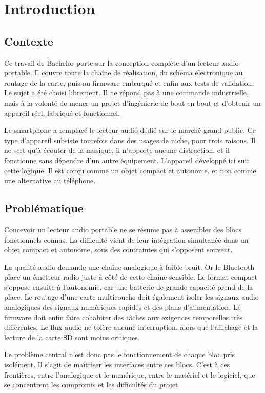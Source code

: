 \chapter{Introduction}

\section{Contexte}
Ce travail de Bachelor porte sur la conception complète d'un lecteur audio portable. Il couvre toute la chaîne de réalisation, du schéma électronique au routage de la carte, puis au firmware embarqué et enfin aux tests de validation. Le sujet a été choisi librement. Il ne répond pas à une commande industrielle, mais à la volonté de mener un projet d'ingénierie de bout en bout et d'obtenir un appareil réel, fabriqué et fonctionnel.

Le smartphone a remplacé le lecteur audio dédié sur le marché grand public. Ce type d'appareil subsiste toutefois dans des usages de niche, pour trois raisons. Il ne sert qu'à écouter de la musique, il n'apporte aucune distraction, et il fonctionne sans dépendre d'un autre équipement. L'appareil développé ici suit cette logique. Il est conçu comme un objet compact et autonome, et non comme une alternative au téléphone.


\section{Problématique}
Concevoir un lecteur audio portable ne se résume pas à assembler des blocs fonctionnels connus. La difficulté vient de leur intégration simultanée dans un objet compact et autonome, sous des contraintes qui s'opposent souvent.

La qualité audio demande une chaîne analogique à faible bruit. Or le Bluetooth place un émetteur radio juste à côté de cette chaîne sensible. Le format compact s'oppose ensuite à l'autonomie, car une batterie de grande capacité prend de la place. Le routage d'une carte multicouche doit également isoler les signaux audio analogiques des signaux numériques rapides et des plans d'alimentation. Le firmware doit enfin faire cohabiter des tâches aux exigences temporelles très différentes. Le flux audio ne tolère aucune interruption, alors que l'affichage et la lecture de la carte SD sont moins critiques.

Le problème central n'est donc pas le fonctionnement de chaque bloc pris isolément. Il s'agit de maîtriser les interfaces entre ces blocs. C'est à ces frontières, entre l'analogique et le numérique, entre le matériel et le logiciel, que se concentrent les compromis et les difficultés du projet.


